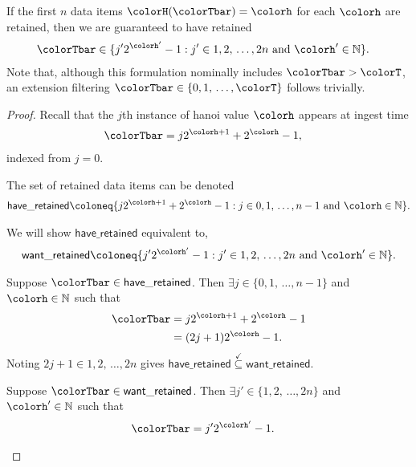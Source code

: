 \begin{lemma}
\label{thm:retained-equivalence-stretched}
If the first $n$ data items $\colorH(\colorTbar) = \colorh$ for each \hv{} $\colorh$ are retained, then we are guaranteed to have retained
\begin{align*}
\colorTbar
&\in
\{
  j'2^{\colorh'} - 1
  :
  j' \in 1,2,\,\ldots,2n
  \text{ and }
  \colorh' \in \mathbb{N}
\}.
\end{align*}
Note that, although this formulation nominally includes $\colorTbar > \colorT$, an extension filtering $\colorTbar \in \{0,1,\,\ldots,\colorT\}$ follows trivially.
\end{lemma}
\begin{proof}

Recall that the $j$th instance of hanoi value $\colorh$ appears at ingest time
\begin{align*}
\colorTbar
&= j2^{\colorh + 1} + 2^{\colorh} - 1,
\end{align*}
indexed from $j=0$.

The set of retained data items can be denoted
\begin{align*}
\mathsf{have\_retained} \coloneq
\{
  j2^{\colorh + 1} + 2^{\colorh} - 1
  :
  j \in 0,1,\,\ldots,n-1
  \text{ and }
  \colorh \in \mathbb{N}
\}.
\end{align*}

We will show $\mathsf{have\_retained}$ equivalent to,
\begin{align*}
\mathsf{want\_retained} \coloneq
\{
  j'2^{\colorh'} - 1
  :
  j' \in 1,2,\,\ldots,2n
  \text{ and }
  \colorh' \in \mathbb{N}
\}.
\end{align*}

\begin{proofpart}
Suppose $\colorTbar \in \mathsf{have\_retained}$.
Then $\exists j \in \{0,1,\,\ldots,n-1\}$ and $\colorh \in \mathbb{N}$ such that
\begin{align*}
\colorTbar
&= j2^{\colorh + 1} + 2^{\colorh} - 1\\
&= (2j + 1)2^{\colorh} - 1.
\end{align*}
Noting $2j + 1 \in 1,2,\,\ldots,2n$ gives $\mathsf{have\_retained} \stackrel{\checkmark}{\subseteq} \mathsf{want\_retained}$.
\end{proofpart}

\begin{proofpart}
Suppose $\colorTbar \in \mathsf{want\_retained}$.
Then $\exists j'\in\{1,2,\,\ldots,2n\}$ and $\colorh' \in \mathbb{N}$ such that
\begin{align*}
\colorTbar
&= j'2^{\colorh'} - 1.
\end{align*}


\end{proofpart}
\end{proof}
